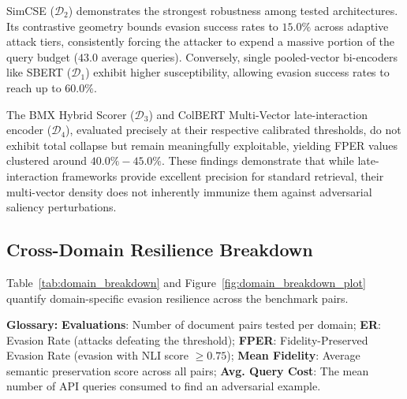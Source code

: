 \documentclass[conference,onecolumn,11pt]{IEEEtran}
\begin{document}
SimCSE ($\mathcal{D}_2$) demonstrates the strongest robustness among tested architectures. Its contrastive geometry bounds evasion success rates to $15.0\%$ across adaptive attack tiers, consistently forcing the attacker to expend a massive portion of the query budget ($43.0$ average queries). Conversely, single pooled-vector bi-encoders like SBERT ($\mathcal{D}_1$) exhibit higher susceptibility, allowing evasion success rates to reach up to $60.0\%$.

The BMX Hybrid Scorer ($\mathcal{D}_3$) and ColBERT Multi-Vector late-interaction encoder ($\mathcal{D}_4$), evaluated precisely at their respective calibrated thresholds, do not exhibit total collapse but remain meaningfully exploitable, yielding FPER values clustered around $40.0\%-45.0\%$. These findings demonstrate that while late-interaction frameworks provide excellent precision for standard retrieval, their multi-vector density does not inherently immunize them against adversarial saliency perturbations.

\subsection{Cross-Domain Resilience Breakdown}

Table~\ref{tab:domain_breakdown} and Figure~\ref{fig:domain_breakdown_plot} quantify domain-specific evasion resilience across the benchmark pairs. 

\begin{table}[htbp]
\centering
\caption{Domain-Specific Evaluation Metrics Under Saliency-Guided Attack ($\mathcal{B}=50, \theta_{\text{fid}}=0.75$).}
\label{tab:domain_breakdown}
\vspace{1em}
\small \textbf{Glossary:} \textbf{Evaluations}: Number of document pairs tested per domain; \textbf{ER}: Evasion Rate (attacks defeating the threshold); \textbf{FPER}: Fidelity-Preserved Evasion Rate (evasion with NLI score $\ge 0.75$); \textbf{Mean Fidelity}: Average semantic preservation score across all pairs; \textbf{Avg. Query Cost}: The mean number of API queries consumed to find an adversarial example.
\end{table}
\end{document}
